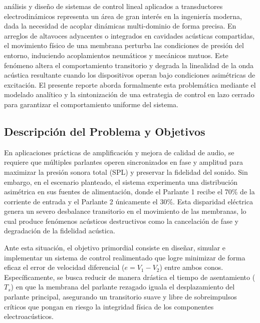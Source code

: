 \documentclass[journal]{IEEEtran}
\begin{document}
 análisis y diseño de sistemas de control lineal aplicados a transductores electrodinámicos representa un área de gran interés en la ingeniería moderna, dada la necesidad de acoplar dinámicas multi-dominio de forma precisa. En arreglos de altavoces adyacentes o integrados en cavidades acústicas compartidas, el movimiento físico de una membrana perturba las condiciones de presión del entorno, induciendo acoplamientos neumáticos y mecánicos mutuos. Este fenómeno altera el comportamiento transitorio y degrada la linealidad de la onda acústica resultante cuando los dispositivos operan bajo condiciones asimétricas de excitación. El presente reporte aborda formalmente esta problemática mediante el modelado analítico y la sintonización de una estrategia de control en lazo cerrado para garantizar el comportamiento uniforme del sistema.


\subsection{Descripción del Problema y Objetivos}
En aplicaciones prácticas de amplificación y mejora de calidad de audio, se requiere que múltiples parlantes operen sincronizados en fase y amplitud para maximizar la presión sonora total (SPL) y preservar la fidelidad del sonido. Sin embargo, en el escenario planteado, el sistema experimenta una distribución asimétrica en sus fuentes de alimentación, donde el Parlante 1 recibe el 70\% de la corriente de entrada y el Parlante 2 únicamente el 30\%. Esta disparidad eléctrica genera un severo desbalance transitorio en el movimiento de las membranas, lo cual produce fenómenos acústicos destructivos como la cancelación de fase y degradación de la fidelidad acústica.

Ante esta situación, el objetivo primordial consiste en diseñar, simular e implementar un sistema de control realimentado que logre minimizar de forma eficaz el error de velocidad diferencial ($e = V_1 - V_2$) entre ambos conos. Específicamente, se busca reducir de manera drástica el tiempo de asentamiento ($T_s$) en que la membrana del parlante rezagado iguala el desplazamiento del parlante principal, asegurando un transitorio suave y libre de sobreimpulsos críticos que pongan en riesgo la integridad física de los componentes electroacústicos.
\end{document}
